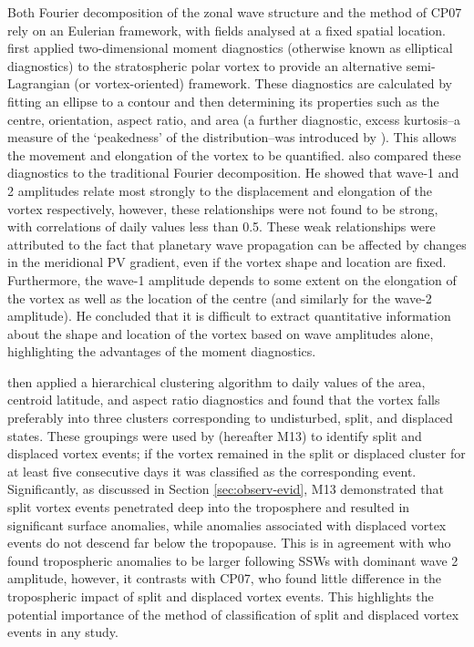 Both Fourier decomposition of the zonal wave structure and the method of CP07
rely on an Eulerian framework, with fields analysed at a fixed spatial
location. \citet{Waugh1997} first applied two-dimensional moment diagnostics
(otherwise known as elliptical diagnostics) to the stratospheric polar vortex to
provide an alternative semi-Lagrangian (or vortex-oriented) framework. These
diagnostics are calculated by fitting an ellipse to a contour and then
determining its properties such as the centre, orientation, aspect ratio, and
area (a further diagnostic, excess kurtosis--a measure of the `peakedness' of
the distribution--was introduced by \citet{Matthewman2009}). This allows the
movement and elongation of the vortex to be quantified. \citet{Waugh1997} also
compared these diagnostics to the traditional Fourier decomposition. He showed
that wave-1 and 2 amplitudes relate most strongly to the displacement and
elongation of the vortex respectively, however, these relationships were not
found to be strong, with correlations of daily values less than 0.5. These weak
relationships were attributed to the fact that planetary wave propagation can be
affected by changes in the meridional PV gradient, even if the vortex shape and
location are fixed. Furthermore, the wave-1 amplitude depends to some extent on
the elongation of the vortex as well as the location of the centre (and
similarly for the wave-2 amplitude). He concluded that it is difficult to
extract quantitative information about the shape and location of the vortex
based on wave amplitudes alone, highlighting the advantages of the moment
diagnostics.

\citet{Hannachi2010} then applied a hierarchical clustering algorithm to daily
values of the area, centroid latitude, and aspect ratio diagnostics and found
that the vortex falls preferably into three clusters corresponding to
undisturbed, split, and displaced states. These groupings were used by
\citet{Mitchell2013} (hereafter M13) to identify split and displaced vortex
events; if the vortex remained in the split or displaced cluster for at least
five consecutive days it was classified as the corresponding
event. Significantly, as discussed in Section \ref{sec:observ-evid}, M13
demonstrated that split vortex events penetrated deep into the troposphere and
resulted in significant surface anomalies, while anomalies associated with
displaced vortex events do not descend far below the tropopause. This is in
agreement with \citet{Nakagawa2006} who found tropospheric anomalies to be
larger following SSWs with dominant wave 2 amplitude, however, it contrasts with
CP07, who found little difference in the tropospheric impact of split and
displaced vortex events. This highlights the potential importance of the method
of classification of split and displaced vortex events in any study.

